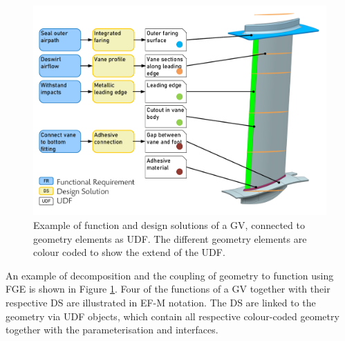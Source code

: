\documentclass[aerospace,article,submit,moreauthors,pdftex]{Definitions/mdpi}
\newcommand{\Jakob}[1]{{{\color{orange}{\itshape{#1}}\color{black}}
    }{\ignorespaces}}
\begin{document}
\begin{figure}[ht]
    \centering
    \includegraphics[width=\textwidth]{figures/pdf/ogvDecomp.pdf}
    \caption{Example of function and design solutions of a GV, connected to geometry elements as UDF.
    The different geometry elements are colour coded to show the extend of the UDF.}
    \label{fig:decompositionExample}
\end{figure}

An example of decomposition and the coupling of geometry to function using \ac{FGE} is shown in Figure \ref{fig:decompositionExample}.
Four of the functions of a \ac{GV} together with their respective \ac{DS} are illustrated in \ac{EF-M} notation.
The \ac{DS} are linked to the geometry via \ac{UDF} objects, which contain all respective colour-coded geometry together with the parameterisation and interfaces.






\end{document}
